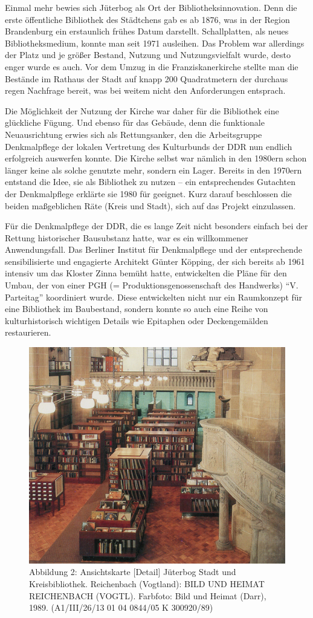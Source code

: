 \documentclass[a4paper,
fontsize=11pt,
oneside,
numbers=noperiodatend,
parskip=half-,
bibliography=totoc,
final
]{scrartcl}
\begin{document}
Einmal mehr bewies sich Jüterbog als Ort der Bibliotheksinnovation. Denn
die erste öffentliche Bibliothek des Städtchens gab es ab 1876, was in
der Region Brandenburg ein erstaunlich frühes Datum darstellt.
Schallplatten, als neues Bibliotheksmedium, konnte man seit 1971
ausleihen. Das Problem war allerdings der Platz und je größer Bestand,
Nutzung und Nutzungsvielfalt wurde, desto enger wurde es auch. Vor dem
Umzug in die Franziskanerkirche stellte man die Bestände im Rathaus der
Stadt auf knapp 200 Quadratmetern der durchaus regen Nachfrage bereit,
was bei weitem nicht den Anforderungen entsprach.

Die Möglichkeit der Nutzung der Kirche war daher für die Bibliothek eine
glückliche Fügung. Und ebenso für das Gebäude, denn die funktionale
Neuausrichtung erwies sich als Rettungsanker, den die Arbeitsgruppe
Denkmalpflege der lokalen Vertretung des Kulturbunds der DDR nun endlich
erfolgreich auswerfen konnte. Die Kirche selbst war nämlich in den
1980ern schon länger keine als solche genutzte mehr, sondern ein Lager.
Bereits in den 1970ern entstand die Idee, sie als Bibliothek zu nutzen
-- ein entsprechendes Gutachten der Denkmalpflege erklärte sie 1980 für
geeignet. Kurz darauf beschlossen die beiden maßgeblichen Räte (Kreis
und Stadt), sich auf das Projekt einzulassen.

Für die Denkmalpflege der DDR, die es lange Zeit nicht besonders einfach
bei der Rettung historischer Bausubstanz hatte, war es ein willkommener
Anwendungsfall. Das Berliner Institut für Denkmalpflege und der
entsprechende sensibilisierte und engagierte Architekt Günter Köpping,
der sich bereits ab 1961 intensiv um das Kloster Zinna bemüht hatte,
entwickelten die Pläne für den Umbau, der von einer PGH (=
Produktionsgenossenschaft des Handwerks) \enquote{V. Parteitag}
koordiniert wurde. Diese entwickelten nicht nur ein Raumkonzept für eine
Bibliothek im Baubestand, sondern konnte so auch eine Reihe von
kulturhistorisch wichtigen Details wie Epitaphen oder Deckengemälden
restaurieren.

\begin{figure}
\centering
\includegraphics[width=.7\textwidth]{img/Abb2.jpg}
\caption{Abbildung 2: Ansichtskarte {[}Detail{]} Jüterbog Stadt und
Kreisbibliothek. Reichenbach (Vogtland): BILD UND HEIMAT REICHENBACH
(VOGTL). Farbfoto: Bild und Heimat (Darr), 1989. (A1/III/26/13 01 04
0844/05 K 300920/89)}
\end{figure}
\end{document}
